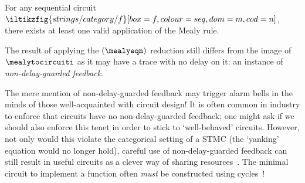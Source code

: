 \begin{corollary}
    For any sequential circuit \(
        \iltikzfig{strings/category/f}[box=f, colour=seq, dom=m, cod=n]
    \), there exists at least one valid application of the Mealy rule.
\end{corollary}

The result of applying the \((\mealyeqn)\) reduction still differs from the
image of \(\mealytocircuiti\) as it may have a trace with no delay on it: an
instance of \emph{non-delay-guarded feedback}.

\begin{remark}
    The mere mention of non-delay-guarded feedback may trigger alarm bells in
    the minds of those well-acquainted with circuit design!
    It is often common in industry to enforce that circuits have no
    non-delay-guarded feedback; one might ask if we should also enforce this
    tenet in order to stick to `well-behaved' circuits.
    However, not only would this violate the categorical setting of a STMC (the
    `yanking' equation would no longer hold), careful use of non-delay-guarded
    feedback can still result in useful circuits as a clever way of sharing
    resources~\cite{malik1994analysis,riedel2004cyclic,mendler2012constructive}.
    The minimal circuit to implement a function often \emph{must} be
    constructed using cycles~\cite{rivest1977necessity,riedel2003synthesis}!
\end{remark}

